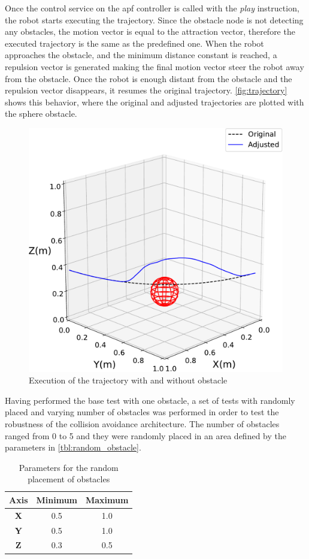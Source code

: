 \par Once the control service on the \ac{apf} controller is called with the \textit{play} instruction, the robot starts executing the trajectory. Since the obstacle node is not detecting any obstacles, the motion vector is equal to the attraction vector, therefore the executed trajectory is the same as the predefined one. When the robot approaches the obstacle, and the minimum distance constant is reached, a repulsion vector is generated making the final motion vector steer the robot away from the obstacle. Once the robot is enough distant from the obstacle and the repulsion vector disappears, it resumes the original trajectory. \autoref{fig:trajectory} shows this behavior, where the original and adjusted trajectories are plotted with the sphere obstacle.

\begin{figure}[h]
    \centering
    \includegraphics[width=0.6\linewidth]{figs/chp6/trajectory_3d.pdf}
    \caption{Execution of the trajectory with and without obstacle}
    \label{fig:trajectory}
\end{figure}

\par Having performed the base test with one obstacle, a set of tests with randomly placed and varying number of obstacles was performed in order to test the robustness of the collision avoidance architecture. The number of obstacles ranged from 0 to 5 and they were randomly placed in an area defined by the parameters in \autoref{tbl:random_obstacle}.

\begin{table}[h]
    \centering
    \begin{tabular}{|c|c|c|}
    \hline
    \textbf{Axis} & \textbf{Minimum} & \textbf{Maximum} \\ \hline
    \textbf{X} & 0.5 & 1.0 \\ \hline
    \textbf{Y} & 0.5 & 1.0 \\ \hline
    \textbf{Z} & 0.3 & 0.5 \\ \hline
    \end{tabular}
    \caption{Parameters for the random placement of obstacles}
    \label{tbl:random_obstacle}
\end{table}

